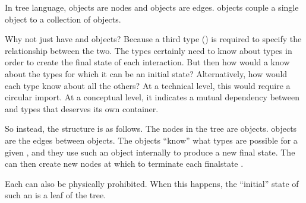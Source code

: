 \documentclass[letterpaper,10pt,english]{sphinxmanual}
\begin{document}
In tree language,  objects are nodes and  objects are edges.
 objects couple a single  object to a collection of
 objects.

Why not just have  and  objects? Because a third type
() is required to specify the relationship between the two. The
 types certainly need to know about  types in order to
create the final state of each interaction. But then how would a 
know about the  types for which it can be an initial state?
Alternatively, how would each  type know about all the others? At
a technical level, this would require a circular import. At a conceptual
level, it indicates a mutual dependency between  and 
types that deserves its own container.

So instead, the structure is as follows. The nodes in the tree are 
objects.  objects are the edges between  objects. The 
objects “know” what  types are possible for a given ,
and they use such an  object internally to produce a new final
state. The  can then create new  nodes at which to terminate
each final\sphinxhyphen{}state .

Each  can also be physically prohibited. When this happens, the
“initial” state of such an  is a leaf of the tree.
\end{document}
